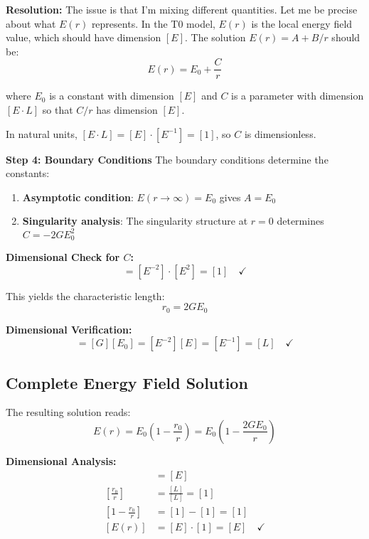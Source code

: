 \documentclass[12pt,a4paper]{report}
\newcommand{\rzero}{r_0}                  %
\begin{document}
	\textbf{Resolution:} The issue is that I'm mixing different quantities. Let me be precise about what $E(r)$ represents. In the T0 model, $E(r)$ is the local energy field value, which should have dimension $[E]$. The solution $E(r) = A + B/r$ should be:
	\begin{equation}
		E(r) = E_0 + \frac{C}{r}
	\end{equation}
	
	where $E_0$ is a constant with dimension $[E]$ and $C$ is a parameter with dimension $[E \cdot L]$ so that $C/r$ has dimension $[E]$.
	
	In natural units, $[E \cdot L] = [E] \cdot [E^{-1}] = [1]$, so $C$ is dimensionless.
	
	\textbf{Step 4: Boundary Conditions}
	The boundary conditions determine the constants:
	\begin{enumerate}
		\item \textbf{Asymptotic condition}: $E(r \to \infty) = E_0$ gives $A = E_0$
		\item \textbf{Singularity analysis}: The singularity structure at $r = 0$ determines $C = -2GE_0^2$
	\end{enumerate}
	
	\textbf{Dimensional Check for $C$:}
	\begin{equation}
		[2GE_0^2] = [E^{-2}] \cdot [E^2] = [1] \quad \checkmark
	\end{equation}
	
	This yields the characteristic length:
	\begin{equation}
		\boxed{\rzero = 2GE_0}
	\end{equation}
	
	\textbf{Dimensional Verification:}
	\begin{equation}
		[\rzero] = [G][E_0] = [E^{-2}][E] = [E^{-1}] = [L] \quad \checkmark
	\end{equation}
	
	\subsection{Complete Energy Field Solution}\label{subsec:complete_solution}
	
	The resulting solution reads:
	\begin{equation}
		\boxed{E(r) = E_0\left(1 - \frac{\rzero}{r}\right) = E_0\left(1 - \frac{2GE_0}{r}\right)}
		\label{eq:complete_energy_solution}
	\end{equation}
	
	\textbf{Dimensional Analysis:}
	\begin{align}
		[E_0] &= [E] \\
		\left[\frac{\rzero}{r}\right] &= \frac{[L]}{[L]} = [1] \\
		\left[1 - \frac{\rzero}{r}\right] &= [1] - [1] = [1] \\
		[E(r)] &= [E] \cdot [1] = [E] \quad \checkmark
	\end{align}
	
\end{document}
